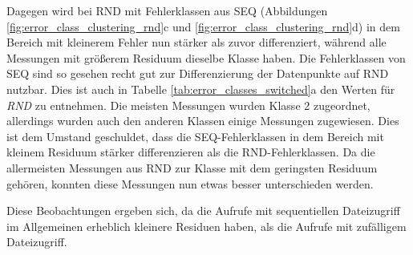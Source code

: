 \documentclass[
	twoside,
	12pt,
	a4paper,
	BCOR10mm,
	DIV14,
	listof=totoc,
	bibliography=totoc,
	headsepline
]{scrreprt}
\begin{document}
Dagegen wird bei RND mit Fehlerklassen aus SEQ (Abbildungen \ref{fig:error_class_clustering_rnd}c und \ref{fig:error_class_clustering_rnd}d) in dem Bereich mit kleinerem Fehler nun stärker als zuvor differenziert, während alle Messungen mit größerem Residuum dieselbe Klasse haben.
Die Fehlerklassen von SEQ sind so gesehen recht gut zur Differenzierung der Datenpunkte auf RND nutzbar.
Dies ist auch in Tabelle \ref{tab:error_classes_switched}a den Werten für \textit{RND} zu entnehmen. Die meisten Messungen wurden Klasse 2 zugeordnet, allerdings wurden auch den anderen Klassen einige Messungen zugewiesen.
Dies ist dem Umstand geschuldet, dass die SEQ-Fehlerklassen in dem Bereich mit kleinem Residuum stärker differenzieren als die RND-Fehlerklassen.
Da die allermeisten Messungen aus RND zur Klasse mit dem geringsten Residuum gehören, konnten diese Messungen nun etwas besser unterschieden werden.\medskip

Diese Beobachtungen ergeben sich, da die Aufrufe mit sequentiellen Dateizugriff im Allgemeinen erheblich kleinere Residuen haben, als die Aufrufe mit zufälligem Dateizugriff.
\end{document}

